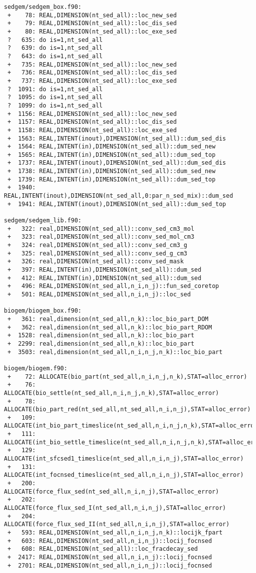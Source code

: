 \documentclass[a4paper,10pt,article]{memoir}
\begin{document}
\begin{small}
\begin{verbatim}
sedgem/sedgem_box.f90:
 +    78: REAL,DIMENSION(nt_sed_all)::loc_new_sed
 +    79: REAL,DIMENSION(nt_sed_all)::loc_dis_sed
 +    80: REAL,DIMENSION(nt_sed_all)::loc_exe_sed
 ?   635: do is=1,nt_sed_all
 ?   639: do is=1,nt_sed_all
 ?   643: do is=1,nt_sed_all
 +   735: REAL,DIMENSION(nt_sed_all)::loc_new_sed
 +   736: REAL,DIMENSION(nt_sed_all)::loc_dis_sed
 +   737: REAL,DIMENSION(nt_sed_all)::loc_exe_sed
 ?  1091: do is=1,nt_sed_all
 ?  1095: do is=1,nt_sed_all
 ?  1099: do is=1,nt_sed_all
 +  1156: REAL,DIMENSION(nt_sed_all)::loc_new_sed
 +  1157: REAL,DIMENSION(nt_sed_all)::loc_dis_sed
 +  1158: REAL,DIMENSION(nt_sed_all)::loc_exe_sed
 +  1563: REAL,INTENT(inout),DIMENSION(nt_sed_all)::dum_sed_dis
 +  1564: REAL,INTENT(in),DIMENSION(nt_sed_all)::dum_sed_new
 +  1565: REAL,INTENT(in),DIMENSION(nt_sed_all)::dum_sed_top
 +  1737: REAL,INTENT(inout),DIMENSION(nt_sed_all)::dum_sed_dis
 +  1738: REAL,INTENT(in),DIMENSION(nt_sed_all)::dum_sed_new
 +  1739: REAL,INTENT(in),DIMENSION(nt_sed_all)::dum_sed_top
 +  1940: REAL,INTENT(inout),DIMENSION(nt_sed_all,0:par_n_sed_mix)::dum_sed
 +  1941: REAL,INTENT(inout),DIMENSION(nt_sed_all)::dum_sed_top

sedgem/sedgem_lib.f90:
 +   322: real,DIMENSION(nt_sed_all)::conv_sed_cm3_mol
 +   323: real,DIMENSION(nt_sed_all)::conv_sed_mol_cm3
 +   324: real,DIMENSION(nt_sed_all)::conv_sed_cm3_g
 +   325: real,DIMENSION(nt_sed_all)::conv_sed_g_cm3
 +   326: real,DIMENSION(nt_sed_all)::conv_sed_mask
 +   397: REAL,INTENT(in),DIMENSION(nt_sed_all)::dum_sed
 +   412: REAL,INTENT(in),DIMENSION(nt_sed_all)::dum_sed
 +   496: REAL,DIMENSION(nt_sed_all,n_i,n_j)::fun_sed_coretop
 +   501: REAL,DIMENSION(nt_sed_all,n_i,n_j)::loc_sed

biogem/biogem_box.f90:
 +   361: real,dimension(nt_sed_all,n_k)::loc_bio_part_DOM
 +   362: real,dimension(nt_sed_all,n_k)::loc_bio_part_RDOM
 +  1528: real,dimension(nt_sed_all,n_k)::loc_bio_part
 +  2299: real,dimension(nt_sed_all,n_k)::loc_bio_part
 +  3503: real,dimension(nt_sed_all,n_i,n_j,n_k)::loc_bio_part

biogem/biogem.f90:
 +    72: ALLOCATE(bio_part(nt_sed_all,n_i,n_j,n_k),STAT=alloc_error)
 +    76: ALLOCATE(bio_settle(nt_sed_all,n_i,n_j,n_k),STAT=alloc_error)
 +    78: ALLOCATE(bio_part_red(nt_sed_all,nt_sed_all,n_i,n_j),STAT=alloc_error)
 +   109: ALLOCATE(int_bio_part_timeslice(nt_sed_all,n_i,n_j,n_k),STAT=alloc_error)
 +   111: ALLOCATE(int_bio_settle_timeslice(nt_sed_all,n_i,n_j,n_k),STAT=alloc_error)
 +   129: ALLOCATE(int_sfcsed1_timeslice(nt_sed_all,n_i,n_j),STAT=alloc_error)
 +   131: ALLOCATE(int_focnsed_timeslice(nt_sed_all,n_i,n_j),STAT=alloc_error)
 +   200: ALLOCATE(force_flux_sed(nt_sed_all,n_i,n_j),STAT=alloc_error)
 +   202: ALLOCATE(force_flux_sed_I(nt_sed_all,n_i,n_j),STAT=alloc_error)
 +   204: ALLOCATE(force_flux_sed_II(nt_sed_all,n_i,n_j),STAT=alloc_error)
 +   593: REAL,DIMENSION(nt_sed_all,n_i,n_j,n_k)::locijk_fpart
 +   603: REAL,DIMENSION(nt_sed_all,n_i,n_j)::locij_focnsed
 +   608: REAL,DIMENSION(nt_sed_all)::loc_fracdecay_sed
 +  2417: REAL,DIMENSION(nt_sed_all,n_i,n_j)::locij_focnsed
 +  2701: REAL,DIMENSION(nt_sed_all,n_i,n_j)::locij_focnsed


\end{verbatim}
\end{small}
\end{document}
